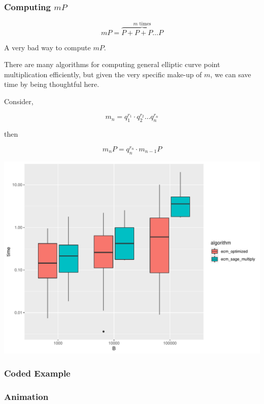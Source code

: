 \documentclass{beamer}
\begin{document}
\begin{frame}
\frametitle{Computing $mP$}

\[ mP = \overbrace{P + P + P \ldots P}^\text{$m$ times} \]
\begin{center}
    A very bad way to compute $mP$.
\end{center}

There are many algorithms for computing general elliptic curve point multiplication efficiently, but given the very specific make-up of $m$, we can save time by being thoughtful here.

Consider,

\[ m_n = q_1^{r_1} \cdot q_2^{r_2} \ldots q_n^{r_n} \]

then

\[ m_nP = q_n^{r_n} \cdot m_{n-1}P \]

\end{frame}

\begin{frame}

\includegraphics[width=\textwidth]{graphs/ecm_perf.pdf}

\end{frame}

\begin{frame}
\frametitle{Coded Example}



\end{frame}

\begin{frame}
\frametitle{Animation}

\end{frame}
\end{document}

